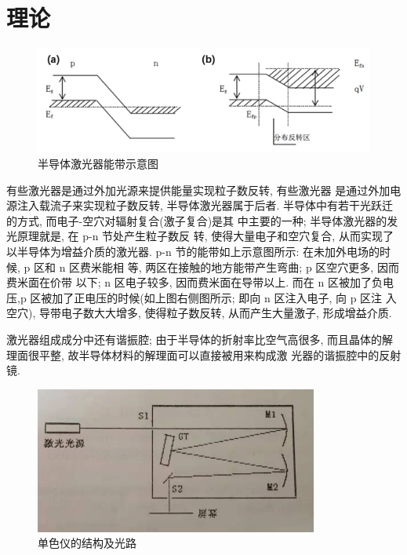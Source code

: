 \documentclass[aps,pre,12pt,preprint,%
	onecolumn,showpacs,showkeys,nofootinbib]{revtex4-2}
\begin{document}
\section{理论}
	\begin{figure}[!h]
	\centering
	\includegraphics[width=1.0\linewidth]{img/1.png}
	\caption[半导体激光器能带示意图]{半导体激光器能带示意图}\vspace{1ex}
	\end{figure}
    \par 有些激光器是通过外加光源来提供能量实现粒子数反转, 有些激光器
    是通过外加电源注入载流子来实现粒子数反转, 半导体激光器属于后者.
    半导体中有若干光跃迁的方式, 而电子-空穴对辐射复合(激子复合)是其
    中主要的一种; 半导体激光器的发光原理就是, 在 p-n 节处产生粒子数反
    转, 使得大量电子和空穴复合, 从而实现了以半导体为增益介质的激光器.
    p-n 节的能带如上示意图所示: 在未加外电场的时候, p 区和 n 区费米能相
    等, 两区在接触的地方能带产生弯曲; p 区空穴更多, 因而费米面在价带
    以下; n 区电子较多, 因而费米面在导带以上. 而在 n 区被加了负电压,p
    区被加了正电压的时候(如上图右侧图所示; 即向 n 区注入电子, 向 p 区注
    入空穴), 导带电子数大大增多, 使得粒子数反转, 从而产生大量激子,
    形成增益介质.
    \par 激光器组成成分中还有谐振腔; 由于半导体的折射率比空气高很多,
    而且晶体的解理面很平整, 故半导体材料的解理面可以直接被用来构成激
    光器的谐振腔中的反射镜.
    	\begin{figure}[!h]
    	\centering
    	\includegraphics[width=.7\linewidth]{img/2.png}
    	\caption[单色仪的结构及光路]{单色仪的结构及光路}\vspace{1ex}
    	\end{figure}
\end{document}
